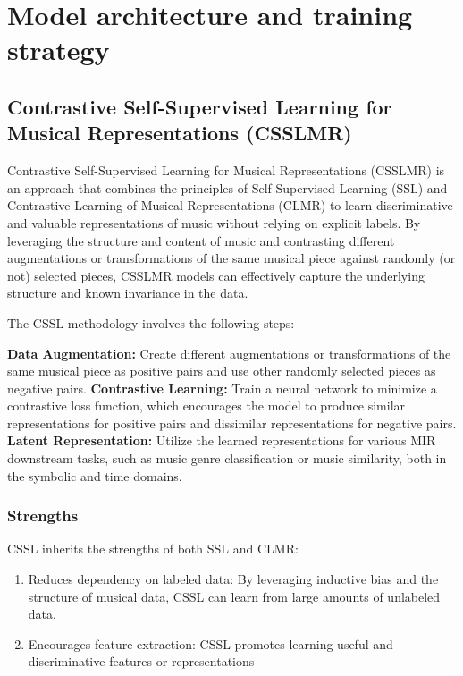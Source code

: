\section{Model architecture and training strategy}
\subsection{Contrastive Self-Supervised Learning for Musical Representations (CSSLMR)}

Contrastive Self-Supervised Learning for Musical Representations (CSSLMR) is an approach that combines the principles of Self-Supervised Learning (SSL) and Contrastive Learning of Musical Representations (CLMR) to learn discriminative and valuable representations of music without relying on explicit labels. By leveraging the structure and content of music and contrasting different augmentations or transformations of the same musical piece against randomly (or not) selected pieces, CSSLMR models can effectively capture the underlying structure and known invariance in the data.

The CSSL methodology involves the following steps:

\textbf{Data Augmentation:} Create different augmentations or transformations of the same musical piece as positive pairs and use other randomly selected pieces as negative pairs.
\textbf{Contrastive Learning:} Train a neural network to minimize a contrastive loss function, which encourages the model to produce similar representations for positive pairs and dissimilar representations for negative pairs.
\textbf{Latent Representation:} Utilize the learned representations for various MIR downstream tasks, such as music genre classification or music similarity, both in the symbolic and time domains.
\subsubsection{Strengths}

CSSL inherits the strengths of both SSL and CLMR:

\begin{enumerate}
\item Reduces dependency on labeled data: By leveraging inductive bias and the structure of musical data, CSSL can learn from large amounts of unlabeled data.
\item Encourages feature extraction: CSSL promotes learning useful and discriminative features or representations
\end{enumerate} 

